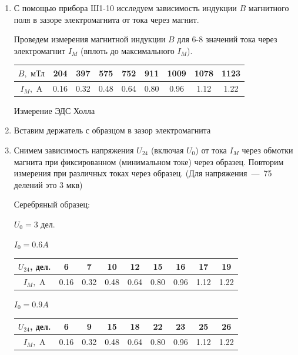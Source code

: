 \documentclass[a4paper, 12pt]{article}
\begin{document}
    \begin{enumerate}
        \item С помощью прибора Ш1-10 исследуем зависимость индукции $B$ магнитного поля в зазоре электромагнита от тока через магнит.
        
        Проведем измерения магнитной индукции $B$ для 6-8 значений тока через электромагнит $I_M$ (вплоть до максимального $I_M$).

        \begin{tabular}{|c|c|c|c|c|c|c|c|c|} \hline
            $B, \text{ мТл}$ & 204 & 397 & 575 & 752 & 911 & 1009 & 1078 & 1123 \\ \hline
            $I_M, \text{ A}$ & 0.16 & 0.32 & 0.48 & 0.64 & 0.80 & 0.96 & 1.12 & 1.22 \\ \hline
        \end{tabular}
    
        \begin{center}
            Измерение ЭДС Холла
        \end{center}

        \item Вставим держатель с образцом в зазор электромагнита
        
        \item Снимем зависимость напряжения $U_{24}$ (включая $U_0$) от тока $I_M$ через обмотки магнита при фиксированном (минимальном токе) через образец. 
        Повторим  измерения при различных токах через образец. (Для напряжения~---~75 делений это 3 мкв)

        Серебряный образец:

        $U_0 = 3$ дел.

        $I_0 = 0.6 A$

        \begin{tabular}{|c|c|c|c|c|c|c|c|c|} \hline
            $U_{24}$, дел. & 6 & 7 & 10 & 12 & 15 & 16 & 17 & 19 \\ \hline
            $I_M, \text{ A}$ & 0.16 & 0.32 & 0.48 & 0.64 & 0.80 & 0.96 & 1.12 & 1.22 \\ \hline
        \end{tabular}

        $I_0 = 0.9 A$

        \begin{tabular}{|c|c|c|c|c|c|c|c|c|} \hline
            $U_{24}$, дел. & 6 & 9 & 15 & 18 & 22 & 23 & 25 & 26 \\ \hline
            $I_M, \text{ A}$ & 0.16 & 0.32 & 0.48 & 0.64 & 0.80 & 0.96 & 1.12 & 1.22 \\ \hline
        \end{tabular}


\end{enumerate}
\end{document}
